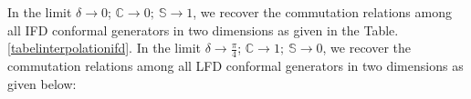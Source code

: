 \documentclass[%
 reprint,
superscriptaddress,
 amsmath,amssymb,
 aps,
]{revtex4-2}
\begin{document}
\begin{comment}
 \hline 
 \rule{0pt}{16pt}$\mathfrak{K}_{\hat{-}}$ & $0$& $2i\mathbb{C}[s_{\delta}D_{\hat{+}}-c_{\delta}D_{\hat{-}}]$&$i\mathbb{C}[s_{\delta}\mathfrak{K}_{\hat{+}}-c_{\delta}\mathfrak{K}_{\hat{-}}]$  & $0$&$-2i[(c_{\delta}-\mathbb{S}s_{\delta})D_{\hat{+}}+(s_{\delta}+\mathbb{S}c_{\delta})D_{\hat{-}}]$ & $-i[(c_{\delta}-\mathbb{S}s_{\delta})\mathfrak{K}_{\hat{+}}+(s_{\delta}+\mathbb{S}c_{\delta})\mathfrak{K}_{\hat{-}}]$\\
 \hline 
 \rule{0pt}{16pt}$P_{\hat{-}}$  & $-2i\mathbb{C}[s_{\delta}D_{\hat{+}}-c_{\delta}D_{\hat{-}}]$&$0$&$-i\mathbb{C}[s_{\delta}P_{\hat{+}}-c_{\delta}P_{\hat{-}}]$ &$2i[(c_{\delta}-\mathbb{S}s_{\delta})D_{\hat{+}}+(s_{\delta}+\mathbb{S}c_{\delta})D_{\hat{-}}]$ & $0$& $i[(c_{\delta}-\mathbb{S}s_{\delta})P_{\hat{+}}+(s_{\delta}+\mathbb{S}c_{\delta})P_{\hat{-}}]$\\
 \hline
 \rule{0pt}{16pt}$D_{\hat{-}}$ & $-i\mathbb{C}[s_{\delta}\mathfrak{K}_{\hat{+}}-c_{\delta}\mathfrak{K}_{\hat{-}}]$& $i\mathbb{C}[s_{\delta}P_{\hat{+}}-c_{\delta}P_{\hat{-}}]$& $0$& $i[(c_{\delta}-\mathbb{S}s_{\delta})\mathfrak{K}_{\hat{+}}+(s_{\delta}+\mathbb{S}c_{\delta})\mathfrak{K}_{\hat{-}}]$& $-i[(c_{\delta}-\mathbb{S}s_{\delta})P_{\hat{+}}+(s_{\delta}+\mathbb{S}c_{\delta})P_{\hat{-}}]$& $0$\\
 \hline  
\end{tabular}}
\end{table}
\end{center}
\end{widetext}

\end{comment}

In the limit $\delta\rightarrow0$; $\mathbb{C}\rightarrow0;~\mathbb{S}\rightarrow1$, we recover the commutation relations among all IFD conformal generators in two dimensions as given in the Table. \ref{tabelinterpolationifd}. In the limit $\delta\rightarrow\frac{\pi}{4}$; $\mathbb{C}\rightarrow1;~\mathbb{S}\rightarrow0$, we recover the commutation relations among all LFD conformal generators in two dimensions as given below:
\end{document}
